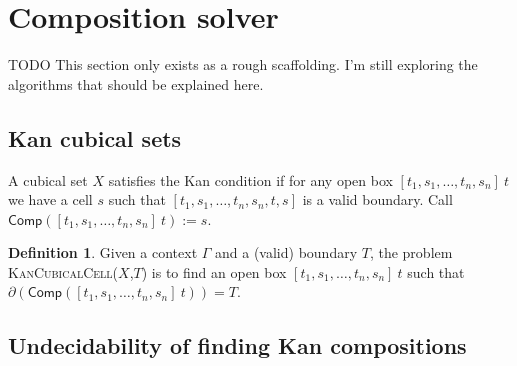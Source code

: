 \documentclass[11pt]{article}
\theoremstyle{definition}
\newtheorem{definition}{Definition}
\newcommand{\continuation}{??}
\newenvironment{examplecontd}[1]
{\renewcommand{\continuation}{\ref{#1}}\expcont[continued]}
{\endexpcont}
\newcommand{\todo}[1]{
  \begin{tcolorbox}
    TODO {#1} 
  \end{tcolorbox}
}
\newcommand{\mdef}{:=}
\newcommand{\problem}[1]{\textsc{{#1}}}
\newcommand{\pint}[1]{\mathbf{1}^{#1}}
\newcommand{\boundary}[1]{\partial({#1})}
\newcommand{\comp}[2]{\mathsf{Comp}({#1}\ {#2})}
\begin{document}







\section{Composition solver}
\label{sec:compositionsolver}

\todo{This section only exists as a rough scaffolding. I'm still exploring the
  algorithms that should be explained here.}

\subsection{Kan cubical sets}

A cubical set $X$ satisfies the Kan condition if for any open box
$[t_1, s_1, \ldots , t_n , s_n] \ t$ we have a cell $s$ such that $[t_1,
s_1, \ldots , t_n , s_n , t, s]$ is a valid boundary. Call $\comp{[t_1, s_1,
  \ldots , t_n , s_n]}{t} \mdef s$. 

\begin{definition}
  Given a context $\Gamma$ and a (valid) boundary $T$, the problem
  \problem{KanCubicalCell}($X$,$T$) is to find an open box $[t_1, s_1, \ldots ,
  t_n , s_n] \ t$ such that $\boundary{\comp{[t_1, s_1, \ldots , t_n , s_n]}{t}} = T$.
\end{definition}



\subsection{Undecidability of finding Kan compositions}
\label{ssec:kanundecidable}
\end{document}
